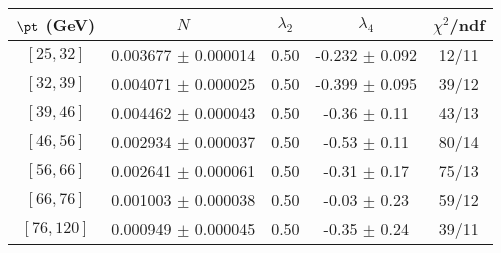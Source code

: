 \begin{tabular}{c||c|c|c|c}
$\pt$ (GeV) & $N$ & $\lambda_{2}$ & $\lambda_4$  & $\chi^2$/ndf  \\
\hline
$[25, 32]$ & 0.003677 $\pm$ 0.000014 & 0.50 & -0.232 $\pm$ 0.092 & 12/11\\
$[32, 39]$ & 0.004071 $\pm$ 0.000025 & 0.50 & -0.399 $\pm$ 0.095 & 39/12\\
$[39, 46]$ & 0.004462 $\pm$ 0.000043 & 0.50 & -0.36 $\pm$ 0.11 & 43/13\\
$[46, 56]$ & 0.002934 $\pm$ 0.000037 & 0.50 & -0.53 $\pm$ 0.11 & 80/14\\
$[56, 66]$ & 0.002641 $\pm$ 0.000061 & 0.50 & -0.31 $\pm$ 0.17 & 75/13\\
$[66, 76]$ & 0.001003 $\pm$ 0.000038 & 0.50 & -0.03 $\pm$ 0.23 & 59/12\\
$[76, 120]$ & 0.000949 $\pm$ 0.000045 & 0.50 & -0.35 $\pm$ 0.24 & 39/11\\
\end{tabular}

